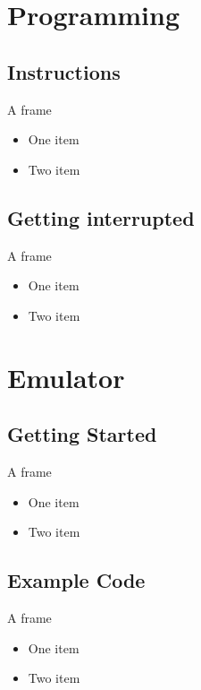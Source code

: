 \documentclass{beamer}
\begin{document}
\section{Programming}

\subsection[Instructions]{Instructions}

\begin{frame}{A frame}
  \begin{itemize}
  \item
    One item
  \item
    Two item
  \end{itemize}
\end{frame}


\subsection[Interupts]{Getting interrupted}

\begin{frame}{A frame}
  \begin{itemize}
  \item
    One item
  \item
    Two item
  \end{itemize}
\end{frame}


\section{Emulator}

\subsection[GettingStarted]{Getting Started}

\begin{frame}{A frame}
  \begin{itemize}
  \item
    One item
  \item
    Two item
  \end{itemize}
\end{frame}

\subsection[Examples]{Example Code}

\begin{frame}{A frame}
  \begin{itemize}
  \item
    One item
  \item
    Two item
  \end{itemize}
\end{frame}
\end{document}
